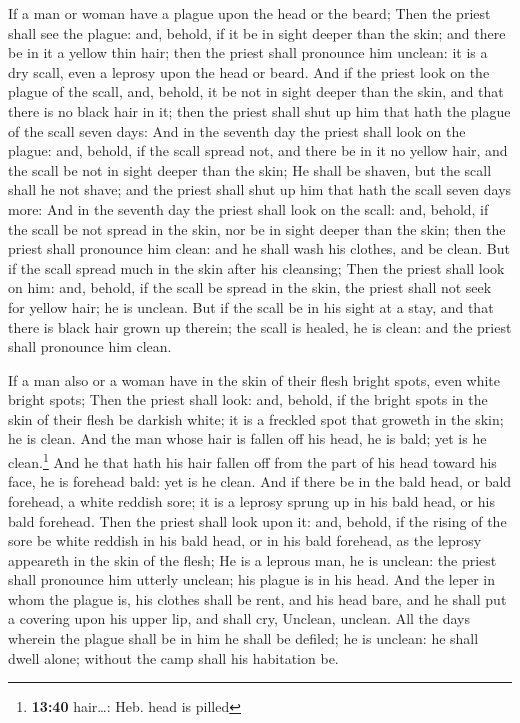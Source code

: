  If a man or woman have a plague upon the head or the
beard;  Then the priest shall see the plague: and,
behold, if it be in sight deeper than the skin; and there be in it a
yellow thin hair; then the priest shall pronounce him unclean: it is a
dry scall, even a leprosy upon the head or beard.  And if
the priest look on the plague of the scall, and, behold, it be not in
sight deeper than the skin, and that there is no black hair in it; then
the priest shall shut up him that hath the plague of the scall seven
days:  And in the seventh day the priest shall look on
the plague: and, behold, if the scall spread not, and there be in it no
yellow hair, and the scall be not in sight deeper than the skin;
 He shall be shaven, but the scall shall he not shave;
and the priest shall shut up him that hath the scall seven days more:
 And in the seventh day the priest shall look on the
scall: and, behold, if the scall be not spread in the skin, nor be in
sight deeper than the skin; then the priest shall pronounce him clean:
and he shall wash his clothes, and be clean.  But if the
scall spread much in the skin after his cleansing;  Then
the priest shall look on him: and, behold, if the scall be spread in the
skin, the priest shall not seek for yellow hair; he is unclean.
 But if the scall be in his sight at a stay, and that
there is black hair grown up therein; the scall is healed, he is clean:
and the priest shall pronounce him clean.

 If a man also or a woman have in the skin of their flesh
bright spots, even white bright spots;  Then the priest
shall look: and, behold, if the bright spots in the skin of their flesh
be darkish white; it is a freckled spot that groweth in the skin; he is
clean.  And the man whose hair is fallen off his head, he
is bald; yet is he clean.\footnote{\textbf{13:40} hair\ldots: Heb. head
  is pilled}  And he that hath his hair fallen off from
the part of his head toward his face, he is forehead bald: yet is he
clean.  And if there be in the bald head, or bald
forehead, a white reddish sore; it is a leprosy sprung up in his bald
head, or his bald forehead.  Then the priest shall look
upon it: and, behold, if the rising of the sore be white reddish in his
bald head, or in his bald forehead, as the leprosy appeareth in the skin
of the flesh;  He is a leprous man, he is unclean: the
priest shall pronounce him utterly unclean; his plague is in his head.
 And the leper in whom the plague is, his clothes shall
be rent, and his head bare, and he shall put a covering upon his upper
lip, and shall cry, Unclean, unclean.  All the days
wherein the plague shall be in him he shall be defiled; he is unclean:
he shall dwell alone; without the camp shall his habitation be.

